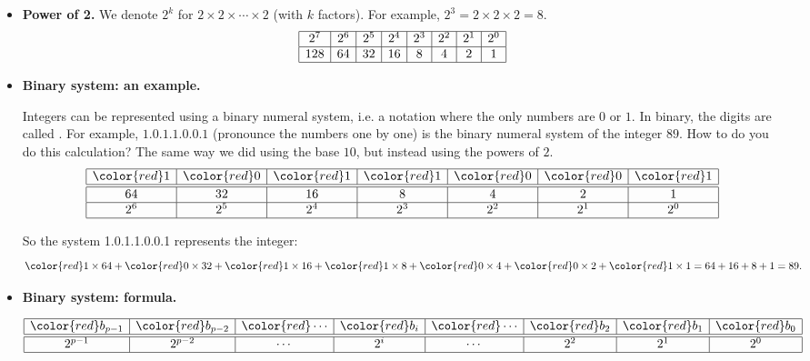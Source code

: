 \documentclass[11pt,class=report,crop=false]{standalone}
\begin{document}
\begin{cours}[Binary]
\sauteligne
\begin{itemize}
  \item \textbf{Power of 2.}
    We denote $2^k$ for $2 \times 2 \times \cdots \times 2$ (with $k$ factors). For example, $2^3 = 2 \times 2 \times 2 = 8$. 
$$
\begin{array}{|c|c|c|c|c|c|c|c|}
  \hline
  2^7  & 2^6 & 2^5 & 2^4 & 2^3 & 2^2 & 2^1 & 2^0 \\
  \hline
  128 & 64 & 32 & 16 & 8 & 4 & 2 & 1 \\ 
  \hline
\end{array}
$$

  \item \textbf{Binary system: an example.}
  
    Integers can be represented using a binary numeral system, i.e. a notation where the only numbers are $0$ or $1$. In binary, the digits are called .
     For example, $1.0.1.1.0.0.1$ (pronounce the numbers one by one) is the binary numeral system of the integer $89$. How to do you do this calculation? The same way we did using the base $10$, but instead using the powers of $2$.
$$
\begin{array}{|c|c|c|c|c|c|c|}
  \hline
  {\color{red}1} & {\color{red}0} & {\color{red}1} & {\color{red}1} & {\color{red}0} & {\color{red}0} & {\color{red}1} \\ 
  \hline\hline
  64 & 32 & 16  & 8 & 4 & 2 & 1 \\\hline
  2^6 & 2^5 & 2^4 & 2^3 & 2^2 & 2^1 & 2^0 \\
  \hline
\end{array}
$$


    So the system {\color{red}1}.{\color{red}0}.{\color{red}1}.{\color{red}1}.{\color{red}0}.{\color{red}0}.{\color{red}1} represents the integer: 
    $${\color{red}1} \times 64  + {\color{red}0} \times 32 + {\color{red}1} \times 16  + {\color{red}1} \times 8 + {\color{red}0} \times 4 + {\color{red}0} \times 2 + {\color{red}1} \times 1 = 64 + 16 + 8 + 1 = 89.$$
    
    
   \item \textbf{Binary system: formula.} 
 
 
  $$
\begin{array}{|c|c|c|c|c|c|c|c|}
  \hline
  {\color{red}b_{p-1}} & {\color{red}b_{p-2}}& {\color{red}\cdots} & {\color{red}b_i}& {\color{red}\cdots} & {\color{red}b_2} & {\color{red}b_1} & {\color{red}b_0} \\ 
  \hline\hline
  2^{p-1} & 2^{p-2} & \cdots & 2^i &\cdots & 2^2 & 2^1 & 2^0 \\
  \hline
\end{array}
$$   
  

\end{itemize}
\end{cours}
\end{document}

